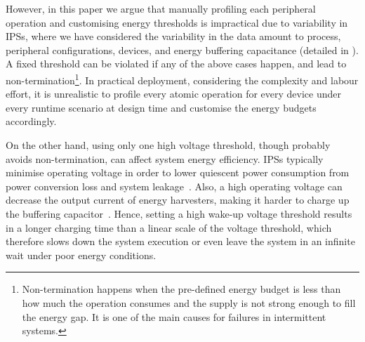 
However, in this paper we argue that manually profiling each peripheral operation and customising energy thresholds is impractical due to variability in IPSs, where we have considered the variability in the data amount to process, peripheral configurations, devices, and energy buffering capacitance (detailed in ). 
A fixed threshold can be violated if any of the above cases happen, and lead to non-termination\footnote{Non-termination happens when the pre-defined energy budget is less than how much the operation consumes and the supply is not strong enough to fill the energy gap. It is one of the main causes for failures in intermittent systems. }.
In practical deployment, considering the complexity and labour effort, it is unrealistic to profile every atomic operation for every device under every runtime scenario at design time and customise the energy budgets accordingly. 



On the other hand, using only one high voltage threshold, though probably avoids non-termination, can affect system energy efficiency. 
IPSs typically minimise operating voltage in order to lower quiescent power consumption from power conversion loss and system leakage~\cite{gomez2016dynamic}. 
Also, a high operating voltage can decrease the output current of energy harvesters, making it harder to charge up the buffering capacitor~\cite{pan2017maximize}.
Hence, setting a high wake-up voltage threshold results in a longer charging time than a linear scale of the voltage threshold, which therefore slows down the system execution or even leave the system in an infinite wait under poor energy conditions.



